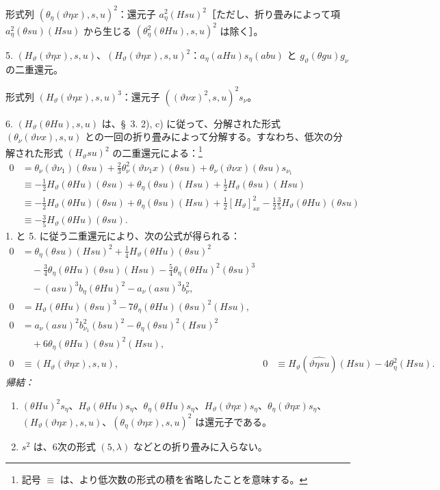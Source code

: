 \documentclass[11pt]{jlreq}
\begin{document}
形式列 $(\theta_\eta(\vartheta\eta x),s,u)^2$：還元子 $a_\eta^2(Hsu)^2$［ただし、折り畳みによって項 $a_\eta^2(\theta su)(Hsu)$ から生じる $(\theta_\eta^2(\theta Hu),s,u)^2$ は除く］。

5. $(H_\vartheta(\vartheta\eta x),s,u)$、$(H_\vartheta(\vartheta\eta x),s,u)^2$：$a_\eta(aHu)s_\eta(abu)$ と $g_\vartheta(\theta gu)g_\nu$ の二重還元。

形式列 $(H_\vartheta(\vartheta\eta x),s,u)^3$：還元子 $((\vartheta\nu x)^2,s,u)^2s_\nu$。

6. $(H_\vartheta(\theta Hu),s,u)$ は、\S\ 3. 2), c) に従って、分解された形式 $(\theta_\nu(\vartheta\nu x),s,u)$ との一回の折り畳みによって分解する。すなわち、低次の分解された形式 $(H_\vartheta su)^2$ の二重還元による：\footnote{記号 $\equiv$ は、より低次数の形式の積を省略したことを意味する。}
\begin{align*}
0&=\theta_\nu(\vartheta\nu_1)(\theta su)+\frac23\theta_\nu^2(\vartheta\nu_1x)(\theta su)+\theta_\nu(\vartheta\nu x)(\theta su)s_{\nu_1}\\
&\equiv -\frac12H_\vartheta(\theta Hu)(\theta su)+\theta_\eta(\theta su)(Hsu)+\frac12H_\vartheta(\theta su)(Hsu)\\
&\equiv -\frac12H_\vartheta(\theta Hu)(\theta su)+\theta_\eta(\theta su)(Hsu)+\frac12[H_\vartheta]_{sx}^2-\frac12\frac35H_\vartheta(\theta Hu)(\theta su)\\
&\equiv -\frac35H_\vartheta(\theta Hu)(\theta su).
\end{align*}
1. と 5. に従う二重還元により、次の公式が得られる：
\begin{equation}
\tag{31}
\begin{aligned}
0&=\theta_\eta(\theta su)(Hsu)^2+\frac14H_\vartheta(\theta Hu)(\theta su)^2\\
&\quad-\frac34\theta_\eta(\theta Hu)(\theta su)(Hsu)-\frac54\theta_\eta(\theta Hu)^2(\theta su)^3\\
&\quad-(asu)^3b_\eta(\theta Hu)^2-a_\nu(asu)^3b_\nu^2,\\
0&=H_\vartheta(\theta Hu)(\theta su)^3-7\theta_\eta(\theta Hu)(\theta su)^2(Hsu),\\
0&=a_\nu(asu)^2b_{\nu_1}^{2}(bsu)^2-\theta_\eta(\theta su)^2(Hsu)^2\\
&\quad+6\theta_\eta(\theta Hu)(\theta su)^2(Hsu),\\
0&\equiv (H_\vartheta(\vartheta\eta x),s,u),
&0&\equiv H_\vartheta(\widehat{\vartheta\eta su})(Hsu)-4\theta_\eta^2(Hsu).
\end{aligned}
\end{equation}
\noindent\emph{帰結：}
\begin{enumerate}
\item $(\theta Hu)^2s_\eta$、$H_\vartheta(\theta Hu)s_\eta$、$\theta_\eta(\theta Hu)s_\eta$、$H_\vartheta(\vartheta\eta x)s_\eta$、$\theta_\eta(\vartheta\eta x)s_\eta$、$(H_\vartheta(\vartheta\eta x),s,u)$、$(\theta_\eta(\vartheta\eta x),s,u)^2$ は還元子である。
\item $s^2$ は、6次の形式 $(5,\lambda)$ などとの折り畳みに入らない。
\end{enumerate}
\end{document}
